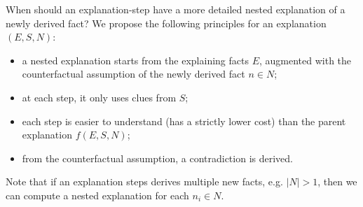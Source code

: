 




When should an explanation-step have a more detailed nested explanation of a newly derived fact? We propose the following principles for an explanation $(E,S,N)$:
\begin{itemize}
 \item a nested explanation starts from the explaining facts $E$, %
 augmented with the counterfactual assumption of the newly derived fact $n \in N$; 
 \item at each step, it only uses clues from $S$;
 \item each step is easier to understand (has a strictly lower cost) than the parent explanation $f(E,S,N)$;
 \item from the counterfactual assumption, a contradiction is derived. %
\end{itemize}

Note that if an explanation steps derives multiple new facts, e.g. $|N| > 1$, then we can compute a nested explanation for each $n_i \in N$.

